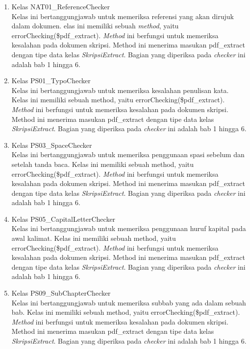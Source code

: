 \begin{enumerate}
	\item Kelas NAT01\_ReferenceChecker \\
	Kelas ini bertanggungjawab untuk memeriksa referensi yang akan dirujuk dalam dokumen. elas ini memiliki sebuah \textit{method}, yaitu errorChecking(\$pdf\_extract). \textit{Method} ini berfungsi untuk memeriksa kesalahan pada dokumen skripsi. Method ini menerima masukan pdf\_extract dengan tipe data kelas \textit{SkripsiExtract}. Bagian yang diperiksa pada \textit{checker} ini adalah bab 1 hingga 6.
		
	\item Kelas PS01\_TypoChecker \\
	Kelas ini bertanggungjawab untuk memeriksa kesalahan penulisan kata. Kelas ini memiliki sebuah method, yaitu errorChecking(\$pdf\_extract). \textit{Method} ini berfungsi untuk memeriksa kesalahan pada dokumen skripsi. Method ini menerima masukan pdf\_extract dengan tipe data kelas \textit{SkripsiExtract}. Bagian yang diperiksa pada \textit{checker} ini adalah bab 1 hingga 6.
			
	\item Kelas PS03\_SpaceChecker \\
	Kelas ini bertanggungjawab untuk memeriksa penggunaan spasi sebelum dan setelah tanda baca. Kelas ini memiliki sebuah method, yaitu errorChecking(\$pdf\_extract).
\textit{Method} ini berfungsi untuk memeriksa kesalahan pada dokumen skripsi. Method ini menerima masukan pdf\_extract dengan tipe data kelas \textit{SkripsiExtract}. Bagian yang diperiksa pada \textit{checker} ini adalah bab 1 hingga 6.
			
	\item Kelas PS05\_CapitalLetterChecker \\
	Kelas ini bertanggungjawab untuk memeriksa penggunaan huruf kapital pada awal kalimat. Kelas ini memiliki sebuah method, yaitu errorChecking(\$pdf\_extract). \textit{Method} ini berfungsi untuk memeriksa kesalahan pada dokumen skripsi. Method ini menerima masukan pdf\_extract dengan tipe data kelas \textit{SkripsiExtract}. Bagian yang diperiksa pada \textit{checker} ini adalah bab 1 hingga 6.
			
	\item Kelas PS09\_SubChapterChecker \\
	Kelas ini bertanggungjawab untuk memeriksa subbab yang ada dalam sebuah bab. Kelas ini memiliki sebuah method, yaitu errorChecking(\$pdf\_extract). \textit{Method} ini berfungsi untuk memeriksa kesalahan pada dokumen skripsi. Method ini menerima masukan pdf\_extract dengan tipe data kelas \textit{SkripsiExtract}. Bagian yang diperiksa pada \textit{checker} ini adalah bab 1 hingga 6.
			

\end{enumerate}
